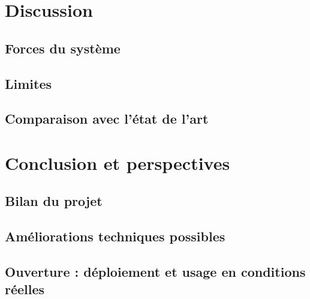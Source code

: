 \documentclass{rapportECL}
\begin{document}
\section{Discussion}

\subsection{Forces du système}

\subsection{Limites}

\subsection{Comparaison avec l'état de l'art}

\section{Conclusion et perspectives}

\subsection{Bilan du projet}

\subsection{Améliorations techniques possibles}

\subsection{Ouverture : déploiement et usage en conditions réelles}

\newpage


\end{document}
